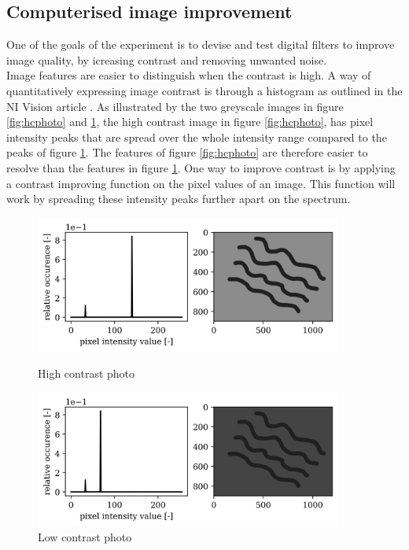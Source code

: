 \subsection{Computerised image improvement}
One of the goals of the experiment is to devise and test digital filters to improve image quality, by icreasing contrast and removing unwanted noise.\\
Image features are easier to distinguish when the contrast is high. A way of quantitatively expressing image contrast is through a histogram as outlined in the NI Vision article \cite{histogram_theory}. As illustrated by the two greyscale images in figure \ref{fig:hcphoto} and \ref{fig:lcphoto}, the high contrast image in figure \ref{fig:hcphoto}, has pixel intensity peaks that are spread over the whole intensity range compared to the peaks of figure \ref{fig:lcphoto}. The features of figure \ref{fig:hcphoto} are therefore easier to resolve than the features in figure \ref{fig:lcphoto}. One way to improve contrast is by applying a contrast improving function on the pixel values of an image. This function will work by spreading these intensity peaks further apart on the spectrum.\\

\begin{figure}[h!]
    \centering
    \begin{minipage}{.5\textwidth}
      \centering
      \includegraphics[width=0.9\textwidth,keepaspectratio]{afbeeldingen/histograms/highcontrast.png}
      \caption{High contrast photo}
      \label{fig:hcphoto}
    \end{minipage}%
    \begin{minipage}{.5\textwidth}
      \centering
      \includegraphics[width=0.9\textwidth,keepaspectratio]{afbeeldingen/histograms/lowcontrast.png}
      \caption{Low contrast photo}
      \label{fig:lcphoto}
    \end{minipage}
\end{figure}

